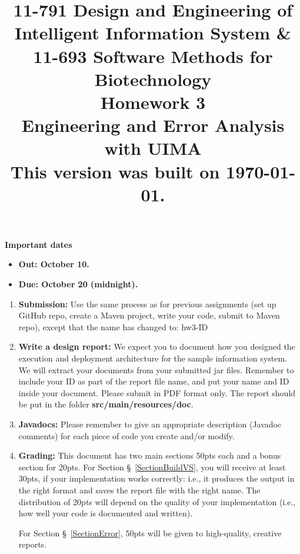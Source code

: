 \documentclass[oneside,11pt]{memoir}
\title{{\bfseries 11-791 Design and Engineering of Intelligent Information
System \& \\11-693 Software Methods for Biotechnology \\Homework 3}\\
\vspace{1em}
Engineering and Error Analysis with UIMA
\\
{\small This version was built on \today.}
}
\date{}
\begin{document}
\maketitle

\hspace{-0.1\textwidth}
\begin{minipage}{1.2\textwidth}
\vspace{-5em}
\textbf{Important dates}
\begin{itemize}

\item \textbf{Out: October 10.} 

\item \textbf{Due: October 20 (midnight).} 

\end{itemize}

\end{minipage}

\begin{enumerate}

\item \textbf{Submission:} 
Use the same process as for previous assignments (set up GitHub repo, create a Maven 
project, write your code, submit to Maven repo), except that the name has changed to:
hw3-ID

\item \textbf{Write a design report:}
We expect you to document how you designed the execution and
deployment architecture for the sample information system. 
We will extract your documents from your
submitted jar files. 
Remember to include your ID as part of the report file name, and put your name and
ID inside your document. Please submit in PDF format only.
The report should be put in the folder \textbf{src/main/resources/doc}.


\item \textbf{Javadocs:} 
Please remember to give an appropriate description (Javadoc comments) for each 
piece of code you create and/or modify.

\item \textbf{Grading:}
This document has two main sections 50pts each and a bonus section 
for 20pts.
For Section \S~\ref{SectionBuildVS}, you will receive at least 30pts,
if your implementation works correctly: i.e., it produces
the output in the right format and saves
the report file with the right name.
The distribution of 20pts will depend on the quality of your implementation
(i.e., how well your code is documented and written).

For Section \S~\ref{SectionError}, 50pts will be given
to high-quality, creative reports.


\end{enumerate}
\end{document}
